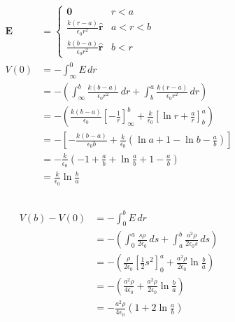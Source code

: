 \documentclass{article}
\renewcommand{\vec}[1]{\boldsymbol{\mathbf{#1}}}
\newcommand{\uvec}[1]{\hat{\vec{#1}}}
\begin{document}
\subsection{}

\begin{align*}
  \vec{E} & = \begin{cases}
                \vec{0}                                   & r < a     \\
                \frac{k (r - a)}{\epsilon_0 r^2} \uvec{r} & a < r < b \\
                \frac{k (b - a)}{\epsilon_0 r^2} \uvec{r} & b < r
              \end{cases}                                                                                           \\
  V(0)    & = -\int_\infty^0 E \,d r                                                                                                                          \\
          & = -\left( \int_\infty^b \frac{k (b - a)}{\epsilon_0 r^2} \,d r + \int_b^a \frac{k (r - a)}{\epsilon_0 r^2} \,d r \right)                          \\
          & = -\left( \frac{k (b - a)}{\epsilon_0} \left[ -\frac{1}{r} \right]_\infty^b + \frac{k}{\epsilon_0} \left[ \ln r + \frac{a}{r} \right]_b^a \right) \\
          & = -\left[ -\frac{k (b - a)}{\epsilon_0 b} + \frac{k}{\epsilon_0} \left( \ln a + 1 - \ln b - \frac{a}{b} \right) \right]                           \\
          & = -\frac{k}{\epsilon_0} \left( -1 + \frac{a}{b} + \ln \frac{a}{b} + 1 - \frac{a}{b} \right)                                                       \\
          & = \frac{k}{\epsilon_0} \ln \frac{b}{a}
\end{align*}

\subsection{}

\begin{align*}
  V(b) - V(0) & = -\int_0^b E \,d r                                                                                                            \\
              & = -\left( \int_0^a \frac{s \rho}{2 \epsilon_0} \,d s + \int_a^b \frac{a^2 \rho}{2 \epsilon_0 s} \,d s \right)                  \\
              & = -\left( \frac{\rho}{2 \epsilon_0} \left[ \frac{1}{2} s^2 \right]_0^a + \frac{a^2 \rho}{2 \epsilon_0} \ln \frac{b}{a} \right) \\
              & = -\left( \frac{a^2 \rho}{4 \epsilon_0} + \frac{a^2 \rho}{2 \epsilon_0} \ln \frac{b}{a} \right)                                \\
              & = -\frac{a^2 \rho}{4 \epsilon_0} \left( 1 + 2 \ln \frac{a}{b} \right)
\end{align*}
\end{document}

